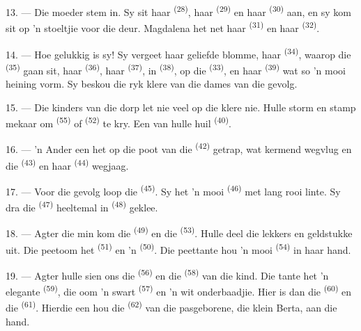 13. --- Die moeder stem in. Sy sit haar  \textsuperscript{(28)}, haar
 \textsuperscript{(29)} en haar  \textsuperscript{(30)}
aan, en sy kom sit op 'n stoeltjie voor die deur. Magdalena het net haar
 \textsuperscript{(31)} en haar 
\textsuperscript{(32)}.

14. --- Hoe gelukkig is sy! Sy vergeet haar geliefde blomme, haar 
\textsuperscript{(34)}, waarop die  \textsuperscript{(35)} gaan
sit, haar  \textsuperscript{(36)}, haar 
\textsuperscript{(37)}, in  \textsuperscript{(38)}, op die 
\textsuperscript{(33)}, en haar  \textsuperscript{(39)} wat so 'n mooi
heining vorm. Sy beskou die ryk klere van die dames van die gevolg.

15. --- Die kinders van die dorp let nie veel op die klere nie. Hulle storm en stamp
mekaar om  \textsuperscript{(55)} of 
\textsuperscript{(52)} te kry. Een van hulle huil \textsuperscript{(40)}.

16. --- 'n Ander een het op die poot van die  \textsuperscript{(42)}
getrap, wat kermend wegvlug en die  \textsuperscript{(43)} en haar
 \textsuperscript{(44)} wegjaag.

\VUsaut{5.0mm}
\VUsaut{4.0mm}

17. --- Voor die gevolg loop die  \textsuperscript{(45)}. Sy het 'n mooi
 \textsuperscript{(46)} met lang rooi linte. Sy dra die
 \textsuperscript{(47)} heeltemal in 
\textsuperscript{(48)} geklee.

18. --- Agter die min kom die  \textsuperscript{(49)} en die
 \textsuperscript{(53)}. Hulle deel die lekkers en geldstukke uit. Die
peetoom het  \textsuperscript{(51)} en 'n 
\textsuperscript{(50)}. Die peettante hou 'n mooi  \textsuperscript{(54)}
in haar hand.

19. --- Agter hulle sien ons die  \textsuperscript{(56)} en die
 \textsuperscript{(58)} van die kind. Die tante het 'n elegante
 \textsuperscript{(59)}, die oom 'n swart 
\textsuperscript{(57)} en 'n wit onderbaadjie. Hier is dan die 
\textsuperscript{(60)} en die  \textsuperscript{(61)}. Hierdie een hou
die  \textsuperscript{(62)} van die pasgeborene, die klein Berta, aan die
hand.

